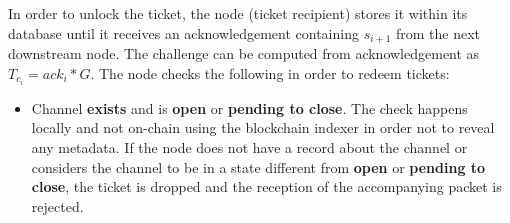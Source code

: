 In order to unlock the ticket, the node (ticket recipient) stores it within its database until it receives an acknowledgement containing $s_{i+1}$ from the next downstream node. The challenge can be computed from acknowledgement as $T_{c_i}=ack_i*G$. The node checks the following in order to redeem tickets:
\begin{itemize}
\item Channel \textbf{exists} and is \textbf{open} or \textbf{pending to close}. The check happens locally and not on-chain using the blockchain indexer in order not to reveal any metadata. If the node does not have a record about the channel or considers the channel to be in a state different from \textbf{open} or \textbf{pending to close}, the ticket is dropped and the reception of the accompanying packet is rejected.


\end{itemize}
